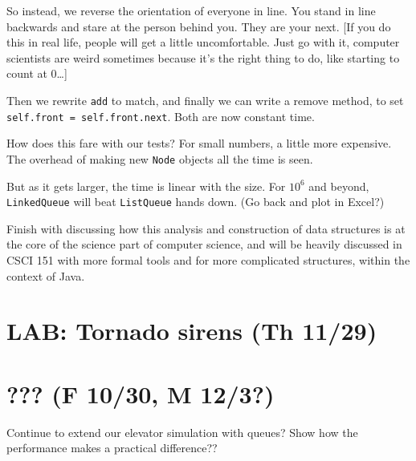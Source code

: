\documentclass{article}
\newcommand{\notready}{\textcolor{red}{\XSolidBold}\xspace}
\begin{document}
So instead, we reverse the orientation of everyone in line. You stand in
line backwards and stare at the person behind you. They are your next. [If
you do this in real life, people will get a little uncomfortable. Just go
with it, computer scientists are weird sometimes because it's the right
thing to do, like starting to count at 0\dots]

Then we rewrite \verb|add| to match, and finally we can write a remove
method, to set \verb|self.front = self.front.next|.  Both are now
constant time.

How does this fare with our tests? For small numbers, a little more
expensive. The overhead of making new \verb|Node| objects all the time
is seen.

But as it gets larger, the time is linear with the size. For $10^6$
and beyond, \verb|LinkedQueue| will beat \verb|ListQueue| hands
down. (Go back and plot in Excel?)

Finish with discussing how this analysis and construction of data
structures is at the core of the science part of computer science, and will
be heavily discussed in CSCI 151 with more formal tools and for more
complicated structures, within the context of Java.

\newpage
\section{\notready LAB: Tornado sirens (Th 11/29)}

\newpage
\section{\notready ??? (F 10/30, M 12/3?)}

Continue to extend our elevator simulation with queues?  Show how the
performance makes a practical difference??
\end{document}
